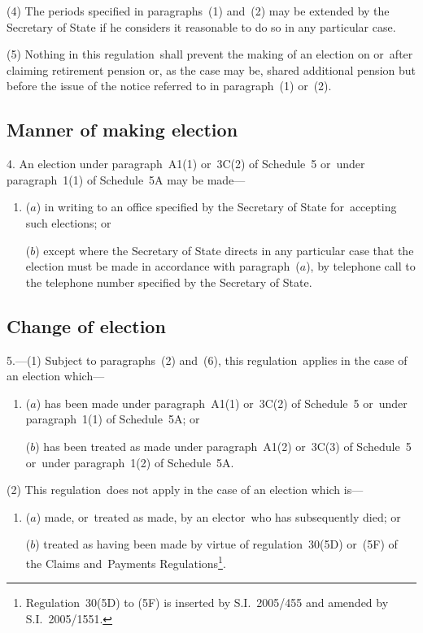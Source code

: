 \documentclass[12pt,a4paper]{article}
\begin{document}
(4) The periods specified in paragraphs~(1) and~(2) may be extended by the Secretary of State if he considers it reasonable to do so in any particular case.

(5) Nothing in this regulation~shall prevent the making of an election on or~after claiming retirement pension or, as the case may be, shared additional pension but before the issue of the notice referred to in paragraph~(1) or~(2).

\subsection[4. Manner of making election]{Manner of making election}

4.  An election under paragraph~A1(1) or~3C(2) of Schedule~5 or~under paragraph~1(1) of Schedule~5A may be made—
\begin{enumerate}\item[]
($a$) in writing to an office specified by the Secretary of State for~accepting such elections; or

($b$) except where the Secretary of State directs in any particular case that the election must be made in accordance with paragraph~($a$), by telephone call to the telephone number specified by the Secretary of State.
\end{enumerate}

\subsection[5. Change of election]{Change of election}

5.---(1)  Subject to paragraphs~(2) and~(6), this regulation~applies in the case of an election which—
\begin{enumerate}\item[]
($a$) has been made under paragraph~A1(1) or~3C(2) of Schedule~5 or~under paragraph~1(1) of Schedule~5A; or

($b$) has been treated as made under paragraph~A1(2) or~3C(3) of Schedule~5 or~under paragraph~1(2) of Schedule~5A.
\end{enumerate}

(2) This regulation~does not apply in the case of an election which is—
\begin{enumerate}\item[]
($a$) made, or~treated as made, by an elector~who has subsequently died; or

($b$) treated as having been made by virtue of regulation~30(5D) or~(5F) of the Claims and~Payments Regulations\footnote{Regulation~30(5D) to (5F) is inserted by S.I.~2005/455 and amended by S.I.~2005/1551.}.
\end{enumerate}
\end{document}
